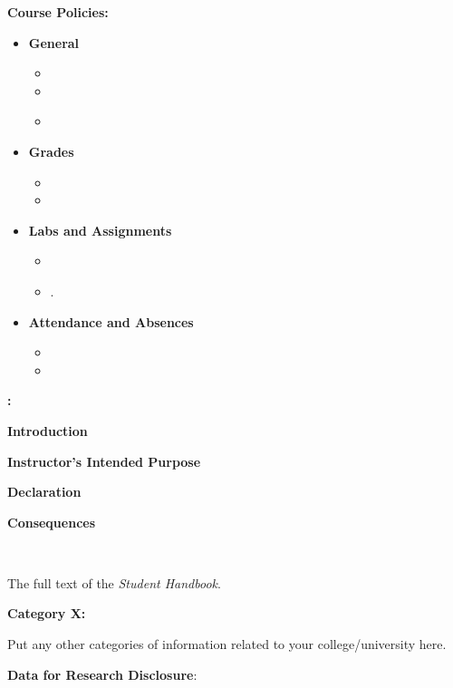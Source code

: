 \documentclass[11pt]{article}
\begin{document}
\textbf {\large Course Policies:}
\begin{itemize}
\item \textbf {General}
\begin{itemize}
\item 
\item 
\item \textbf {}
\end{itemize}
\item \textbf {Grades}
\begin{itemize}
\item 
\item 
\end{itemize}
\item \textbf {Labs and Assignments}
\begin{itemize}
\item 
\item \textbf{}.
\end{itemize}
\item \textbf{Attendance and Absences}
\begin{itemize}
\item 
\item 
\end{itemize}
\end{itemize}

\textbf {\large  :} 

\textbf{Introduction}

\hspace{3mm}
\hangindent=5mm 

\textbf{Instructor's Intended Purpose}

\hspace{3mm}
\hangindent=5mm 


\textbf{Declaration}

\hspace{3mm}
\hangindent=5mm 
\textbf{Consequences}

\hspace{3mm}
\hangindent=5mm  \

The full text of the \emph{Student Handbook}.

\newpage

\textbf {\large Category X:}

\hspace{3mm}
\hangindent=5mm Put any other categories of information related to your college/university here. \

\textbf {\large Data for Research Disclosure}:
\end{document}
